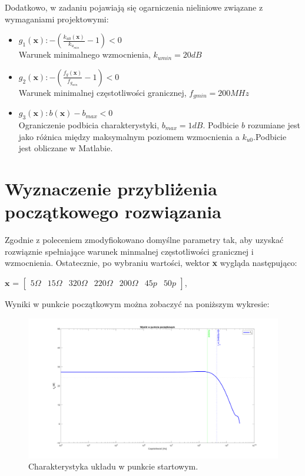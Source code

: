 \documentclass{article}
\begin{document}
Dodatkowo, w zadaniu pojawiają się ogarniczenia nieliniowe związane z wymaganiami projektowymi:\\
\begin{itemize}
	\item \(g_1(\textbf{x}): -(\frac{k_{u0}(\textbf{x})}{k_{u_{min}}}-1) <  0\) \\ Warunek minimalnego wzmocnienia, $k_{umin}=20dB$
	\item \(g_2(\textbf{x}): -(\frac{{f_g}(\textbf{x})}{f_{g_{min}}}-1)<0\) \\ Warunek minimalnej częstotliwości granicznej, $f_{gmin}=200 MHz$
	\item \(g_3(\textbf{x}): b(\textbf{x})-b_{max}<0\) \\ Ograniczenie podbicia charakterystyki, $b_{max}=1dB$. Podbicie $b$ rozumiane jest jako różnica między maksymalnym poziomem wzmocnienia a $k_{u0}$.Podbicie jest obliczane w Matlabie.

\end{itemize}



\section{Wyznaczenie przybliżenia początkowego rozwiązania}
Zgodnie z poleceniem zmodyfiokowano domyślne parametry tak, aby uzyskać rozwiąznie spełniające warunek minmalnej częstotliwości granicznej i wzmocnienia.
Ostatecznie, po wybraniu wartości, wektor \textbf{x} wygląda następująco:
\begin{center}
	$\textbf{x}$ =
	$\begin{bmatrix}
			5\Omega & 15\Omega & 320\Omega & 220\Omega & 200\Omega & 45p & 50p
		\end{bmatrix}$,
\end{center}

Wyniki w punkcie początkowym można zobaczyć na poniższym wykresie:

\begin{figure}[h]
	\includegraphics[width=12cm]{graphics/starting_point.png}
	\centering
	\caption{Charakterystyka układu w punkcie startowym.}
\end{figure}
\end{document}
